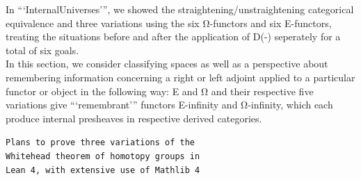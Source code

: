 \documentclass{book}
\theoremstyle{definition}
\begin{document}
In ```InternalUniverses''', we showed the straightening/unstraightening categorical equivalence and three variations using the six Ω-functors and six E-functors, treating the situations before and after the application of D(-) seperately for a total of six goals.\\

In this section, we consider classifying spaces as well as a perspective about remembering information concerning a right or left adjoint applied to a particular functor or object in the following way: E and Ω and their respective five variations give  ```remembrant''' functors E-infinity and Ω-infinity, which each produce internal presheaves in respective derived categories.\\


\begin{center}
\texttt{Plans to prove three variations of the}\\
\texttt{Whitehead theorem of homotopy groups in}\\
\texttt{Lean 4, with extensive use of Mathlib 4}
\end{center}

\thispagestyle{empty}

\ \\
{\footnotesize
\begin{center}
\end{center}}
 
\end{document}
